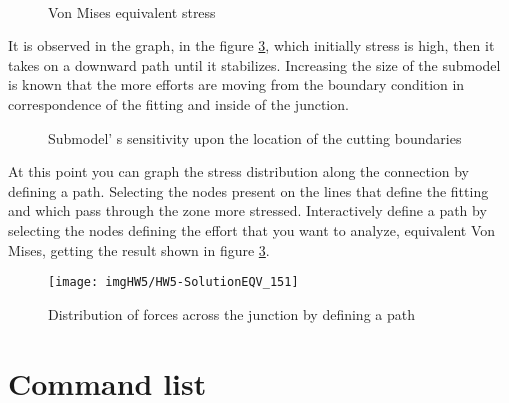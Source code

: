 \begin{figure}[!h]
\centering
{}\,
\caption{Von Mises equivalent stress}
\label{img:HW5-StressEQV_3}
\end{figure}
\newpage
\noindent It is observed in the graph, in the figure \ref{img:HW5-StressSensit}, which initially stress is high, then it takes on a downward path until it stabilizes. Increasing the size of the submodel is known that the more efforts are moving from the boundary condition in correspondence of the fitting and inside of the junction. 
\begin{figure}[!h]
\centering
    \resizebox{.8\linewidth}{!}{}
    \caption{Submodel' s sensitivity upon the location of the cutting boundaries}
    \label{img:HW5-StressSensit}
\end{figure}
\newpage
\noindent At this point you can graph the stress distribution along the connection by defining a path.
Selecting the nodes present on the lines that define the fitting and which pass through the zone more stressed. Interactively define a path by selecting the nodes defining the effort that you want to analyze, equivalent Von Mises, getting the result shown in figure \ref{img:HW5-StressSensit}.
\begin{figure}[!h]
\centering
    \texttt{[image: imgHW5/HW5-SolutionEQV\_151]}
    \caption{Distribution of forces across the junction by defining a path}
    \label{img:HW5-StressSensit}
\end{figure}
\section{Command list}
\tiny
%

\normalsize
